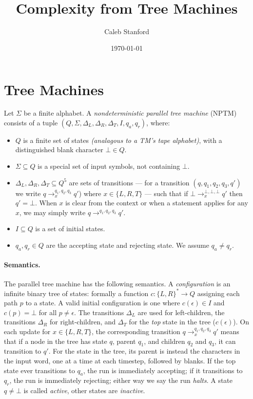 \documentclass{article}
\title{Complexity from Tree Machines}
\author{Caleb Stanford}
\date{\today{}}
\begin{document}
\maketitle

\section{Tree Machines}

\begin{definition}
Let $\Sigma$ be a finite alphabet.
A \emph{nondeterministic parallel tree machine} (NPTM)
consists of a tuple $(Q, \Sigma, \Delta_L, \Delta_R, \Delta_T, I, q_a, q_r)$, where:
\begin{itemize}
\item $Q$ is a finite set of states \emph{(analagous to a TM's tape alphabet)}, with a distinguished blank character $\bot \in Q$.
\item $\Sigma \subseteq Q$ is a special set of input symbols, not containing $\bot$.
\item $\Delta_L, \Delta_R, \Delta_T \subseteq Q^5$ are sets of transitions ---
for a transition $(q, q_1, q_2, q_3, q')$ we write
$q \to^{q_1, q_2, q_3}_x q'$) where $x \in \{L, R, T\}$ ---
such that if $\bot \to^{\bot, \bot, \bot}_x q'$ then $q' = \bot$.
When $x$ is clear from the context or when a statement applies for any $x$, we may simply write $q \to^{q_1, q_2, q_3} q'$.
\item $I \subseteq Q$ is a set of initial states.
\item $q_a, q_r \in Q$ are the accepting state and rejecting state. We assume $q_a \ne q_r$.
\end{itemize}
\end{definition}

\paragraph*{Semantics.} The parallel tree machine has the following semantics.
A \emph{configuration} is an infinite binary tree of states:
formally a function $c: \{L, R\}^* \to Q$ assigning each path $p$ to a state.
A valid initial configuration is one where $c(\epsilon) \in I$ and $c(p) = \bot$ for all $p \ne \epsilon$.
The transitions $\Delta_L$ are used for left-children, the transitions $\Delta_R$ for right-children, and $\Delta_T$ for the \emph{top} state in the tree ($c(\epsilon)$).
On each update for $x \in \{L, R, T\}$, the corresponding transition $q \to^{q_1, q_2, q_3}_x q'$ means that if a node in the tree has state $q$, parent $q_1$, and children $q_2$ and $q_3$, it can transition to $q'$. For the state in the tree, its parent is instead the characters in the input word, one at a time at each timestep, followed by blanks.
If the top state ever transitions to $q_a$, the run is immediately accepting; if it transitions to $q_r$, the run is immediately rejecting; either way we say the run \emph{halts}.
A state $q \ne \bot$ is called \emph{active}, other states are \emph{inactive}.
\end{document}
